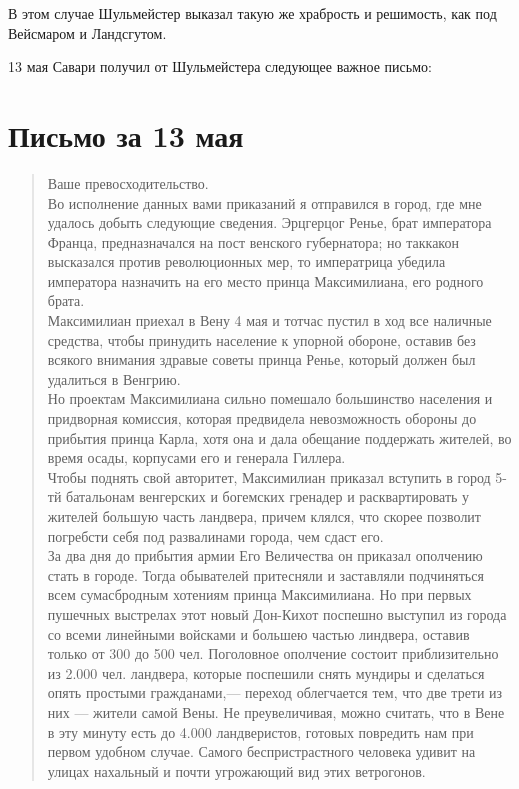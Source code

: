 \documentclass[
  oneside,
  12pt,
  titlepage]{book}
\begin{document}
В этом случае Шульмейстер выказал такую же храбрость и решимость, как под Вейсмаром и Ландсгутом.

13 мая Савари получил от Шульмейстера следующее важное письмо:

\hypertarget{ux43fux438ux441ux44cux43cux43e-ux437ux430-13-ux43cux430ux44f}{%
\section{Письмо за 13 мая}\label{ux43fux438ux441ux44cux43cux43e-ux437ux430-13-ux43cux430ux44f}}

\begin{quote}
Ваше превосходительство.\\
Во исполнение данных вами приказаний я отправился в город, где мне удалось добыть следующие сведения. Эрцгерцог Ренье, брат императора Франца, предназначался на пост венского губернатора; но таккакон высказался против революционных мер, то императрица убедила императора назначить на его место принца Максимилиана, его родного брата.\\
Максимилиан приехал в Вену 4 мая и тотчас пустил в ход все наличные средства, чтобы принудить население к упорной обороне, оставив без всякого внимания здравые советы принца Ренье, который должен был удалиться в Венгрию.\\
Но проектам Максимилиана сильно помешало большинство населения и придворная комиссия, которая предвидела невозможность обороны до прибытия принца Карла, хотя она и дала обещание поддержать жителей, во время осады, корпусами его и генерала Гиллера.\\
Чтобы поднять свой авторитет, Максимилиан приказал вступить в город 5-тй батальонам венгерских и богемских гренадер и расквартировать у жителей большую часть ландвера, причем клялся, что скорее позволит погребсти себя под развалинами города, чем сдаст его.\\
За два дня до прибытия армии Его Величества он приказал ополчению стать в городе. Тогда обывателей притесняли и заставляли подчиняться всем сумасбродным хотениям принца Максимилиана. Но при первых пушечных выстрелах этот новый Дон-Кихот поспешно выступил из города со всеми линейными войсками и большею частью линдвера, оставив только от 300 до 500 чел. Поголовное ополчение состоит приблизительно из 2.000 чел. ландвера, которые поспешили снять мундиры и сделаться опять простыми гражданами,--- переход облегчается тем, что две трети из них --- жители самой Вены. Не преувеличивая, можно считать, что в Вене в эту минуту есть до 4.000 ландверистов, готовых повредить нам при первом удобном случае. Самого беспристрастного человека удивит на улицах нахальный и почти угрожающий вид этих ветрогонов.
\end{quote}
\end{document}
